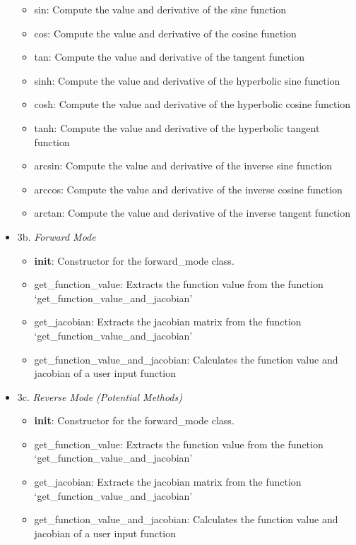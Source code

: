 \documentclass[11pt]{article}
\begin{document}
\begin{itemize}
\begin{itemize}
  \item
    sin: Compute the value and derivative of the sine function
  \item
    cos: Compute the value and derivative of the cosine function
  \item
    tan: Compute the value and derivative of the tangent function
  \item
    sinh: Compute the value and derivative of the hyperbolic sine
    function
  \item
    cosh: Compute the value and derivative of the hyperbolic cosine
    function
  \item
    tanh: Compute the value and derivative of the hyperbolic tangent
    function
  \item
    arcsin: Compute the value and derivative of the inverse sine
    function
  \item
    arccos: Compute the value and derivative of the inverse cosine
    function
  \item
    arctan: Compute the value and derivative of the inverse tangent
    function
  \end{itemize}
\item
  3b. \emph{Forward Mode}

  \begin{itemize}
  \item
    \textbf{init}: Constructor for the forward\_mode class.
  \item
    get\_function\_value: Extracts the function value from the function
    `get\_function\_value\_and\_jacobian'
  \item
    get\_jacobian: Extracts the jacobian matrix from the function
    `get\_function\_value\_and\_jacobian'
  \item
    get\_function\_value\_and\_jacobian: Calculates the function value
    and jacobian of a user input function
  \end{itemize}
\item
  3c. \emph{Reverse Mode (Potential Methods)}

  \begin{itemize}
  \item
    \textbf{init}: Constructor for the forward\_mode class.
  \item
    get\_function\_value: Extracts the function value from the function
    `get\_function\_value\_and\_jacobian'
  \item
    get\_jacobian: Extracts the jacobian matrix from the function
    `get\_function\_value\_and\_jacobian'
  \item
    get\_function\_value\_and\_jacobian: Calculates the function value
    and jacobian of a user input function
  \end{itemize}
\end{itemize}
\end{document}
